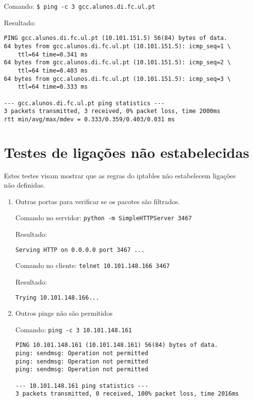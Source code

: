 \documentclass[12pt, a4paper, twoside]{report} %
\begin{document}
\noindent Comando: \texttt{\$ ping -c 3 gcc.alunos.di.fc.ul.pt}

\noindent Resultado:

\begin{lstlisting}
PING gcc.alunos.di.fc.ul.pt (10.101.151.5) 56(84) bytes of data.
64 bytes from gcc.alunos.di.fc.ul.pt (10.101.151.5): icmp_seq=1 \
	ttl=64 time=0.341 ms
64 bytes from gcc.alunos.di.fc.ul.pt (10.101.151.5): icmp_seq=2 \
	ttl=64 time=0.403 ms
64 bytes from gcc.alunos.di.fc.ul.pt (10.101.151.5): icmp_seq=3 \
	ttl=64 time=0.333 ms

--- gcc.alunos.di.fc.ul.pt ping statistics ---
3 packets transmitted, 3 received, 0% packet loss, time 2000ms
rtt min/avg/max/mdev = 0.333/0.359/0.403/0.031 ms
\end{lstlisting}

\clearpage

\section{Testes de ligações não estabelecidas}

Estes testes visam mostrar que as regras do iptables não estabelecem ligações \\ não definidas.

\begin{enumerate}

\item Outras portas para verificar se os pacotes são filtrados.

Comando no servidor: \texttt{python -m SimpleHTTPServer 3467}

\noindent Resultado:

\begin{lstlisting}
Serving HTTP on 0.0.0.0 port 3467 ...
\end{lstlisting}

\noindent Comando no cliente: \texttt{telnet 10.101.148.166 3467}

\noindent Resultado:
\begin{lstlisting}
Trying 10.101.148.166...
\end{lstlisting}

\item Outros pings não são permitidos

Comando: \texttt{ping -c 3 10.101.148.161}

\begin{lstlisting}
PING 10.101.148.161 (10.101.148.161) 56(84) bytes of data.
ping: sendmsg: Operation not permitted
ping: sendmsg: Operation not permitted
ping: sendmsg: Operation not permitted

--- 10.101.148.161 ping statistics ---
3 packets transmitted, 0 received, 100% packet loss, time 2016ms
\end{lstlisting}

\end{enumerate}
\end{document}
